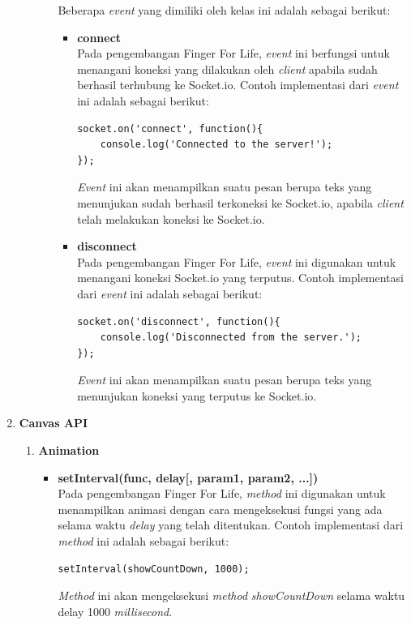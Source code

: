 \begin{enumerate}
\begin{enumerate}
\begin{enumerate}
			Beberapa \textit{event} yang dimiliki oleh kelas ini adalah sebagai berikut:
			\begin{itemize}
				\item \textbf{connect} \\
				Pada pengembangan Finger For Life, \textit{event} ini berfungsi untuk menangani koneksi yang dilakukan oleh \textit{client} apabila sudah berhasil terhubung ke Socket.io. Contoh implementasi dari \textit{event} ini adalah sebagai berikut:
\begin{lstlisting}
socket.on('connect', function(){
	console.log('Connected to the server!');
});
\end{lstlisting}
				\textit{Event} ini akan menampilkan suatu pesan berupa teks yang menunjukan sudah berhasil terkoneksi ke Socket.io, apabila \textit{client} telah melakukan koneksi ke Socket.io.

				\item \textbf{disconnect} \\
				Pada pengembangan Finger For Life, \textit{event} ini digunakan untuk menangani koneksi Socket.io yang terputus. Contoh implementasi dari \textit{event} ini adalah sebagai berikut:
\begin{lstlisting}
socket.on('disconnect', function(){
	console.log('Disconnected from the server.');
});
\end{lstlisting}
				\textit{Event} ini akan menampilkan suatu pesan berupa teks yang menunjukan koneksi yang terputus ke Socket.io.

			\end{itemize}
		\end{enumerate}
	\end{enumerate}
	
	\item \textbf{Canvas API}
	\begin{enumerate}
		\item \textbf{Animation}
		\begin{itemize}
			\item \textbf{setInterval(func, delay[, param1, param2, ...])} \\
			Pada pengembangan Finger For Life, \textit{method} ini digunakan untuk menampilkan animasi dengan cara mengeksekusi fungsi yang ada selama waktu \textit{delay} yang telah ditentukan. Contoh implementasi dari \textit{method} ini adalah sebagai berikut:
\begin{lstlisting}
setInterval(showCountDown, 1000);
\end{lstlisting}
\textit{Method} ini akan mengeksekusi \textit{method} \textit{showCountDown} selama waktu delay 1000 \textit{millisecond}.
			

\end{itemize}
\end{enumerate}
\end{enumerate}
